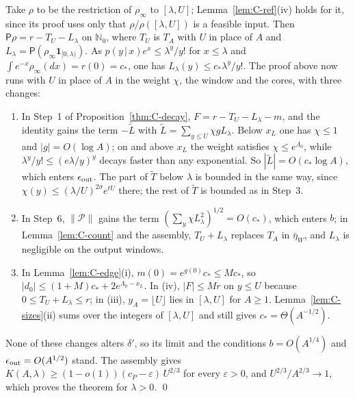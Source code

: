 \documentclass[10pt,letterpaper]{article}
\begin{document}
Take $\rho$ to be the restriction of $\rho_\infty$ to $[\lambda,U]$; Lemma~\ref{lem:C-ref}(iv) holds for it, since its proof uses only
that $\rho/\rho([\lambda,U])$ is a feasible input. Then $\mathsf P\rho=r-T_U-L_\lambda$ on $\mathbb N_0$, where $T_U$ is $T_A$ with $U$ in place
of $A$ and $L_\lambda=\mathsf P(\rho_\infty\mathbf 1_{[0,\lambda)})$. As $p(y\,|\,x)e^x\le\lambda^y/y!$ for
$x\le\lambda$ and $\int e^{-x}\rho_\infty(dx)=r(0)=c_*$, one has $L_\lambda(y)\le c_*\lambda^y/y!$. The proof above now runs with $U$ in
place of $A$ in the weight $\chi$, the window and the cores, with three changes:
\begin{enumerate}
\item In Step~1 of Proposition~\ref{thm:C-decay}, $F=r-T_U-L_\lambda-m$, and the identity gains the term $-\tilde L$ with
$\tilde L=\sum_{y\le U}\chi gL_\lambda$. Below $x_L$ one has $\chi\le1$ and $|g|=O(\log A)$; on and above $x_L$ the weight satisfies $\chi\le e^{\Lambda_0}$, while
$\lambda^y/y!\le(e\lambda/y)^y$ decays faster than any exponential. So $|\tilde L|=O(c_*\log A)$, which enters $\epsilon_{\rm out}$.
The part of $\tilde T$ below $\lambda$ is bounded in the same way, since $\chi(y)\le(\lambda/U)^{2\sigma}e^{tU}$ there; the rest of
$\tilde T$ is bounded as in Step~3.
\item In Step~6, $\|\mathcal P\|$ gains the term $(\sum_y\chi L_\lambda^2)^{1/2}=O(c_*)$, which enters $b$; in Lemma~\ref{lem:C-count} and
the assembly, $T_U+L_\lambda$ replaces $T_A$ in $\bar\eta_W$, and $L_\lambda$ is negligible on the output windows.
\item In Lemma~\ref{lem:C-edge}(i), $m(0)=e^{g(0)}c_*\le Mc_*$, so $|d_0|\le(1+M)c_*+2e^{\Lambda_0-x_L}$. In (iv), $|F|\le Mr$ on
$y\le U$ because $0\le T_U+L_\lambda\le r$; in (iii), $y_A=\lfloor U\rfloor$ lies in $[\lambda,U]$ for $A\ge1$. Lemma~\ref{lem:C-sizes}(ii)
sums over the integers of $[\lambda,U]$ and still gives $c_*=\Theta(A^{-1/2})$.
\end{enumerate}
None of these changes alters $\delta'$, so its limit and the conditions $b=O(A^{1/4})$ and $\epsilon_{\rm out}=O(A^{1/2})$ stand. The
assembly gives $K(A,\lambda)\ge(1-o(1))(c_P-\varepsilon)\,U^{2/3}$ for every $\varepsilon>0$, and $U^{2/3}/A^{2/3}\to1$, which proves the
theorem for $\lambda>0$. \qed
\end{document}
